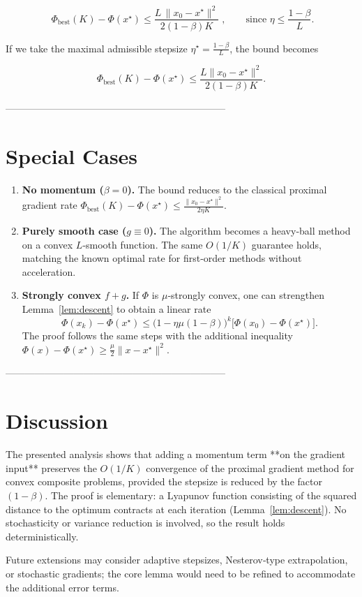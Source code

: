 \documentclass{article}
\begin{document}
\[
\boxed{\;
\Phi_{\text{best}}(K)-\Phi(x^{\star})
\le \frac{L\,\|x_{0}-x^{\star}\|^{2}}{2(1-\beta)K}
\;},
\qquad\text{since }\eta\le\frac{1-\beta}{L}.
\tag{R1}
\]

If we take the maximal admissible stepsize $\eta^{\star}= \frac{1-\beta}{L}$, the bound becomes  

\[
\Phi_{\text{best}}(K)-\Phi(x^{\star})\le \frac{L\|x_{0}-x^{\star}\|^{2}}{2(1-\beta)K}.
\]

--------------------------------------------------------------------

\section*{Special Cases}
\begin{enumerate}[label=\alph*)]
\item \textbf{No momentum ($\beta=0$).}  
The bound reduces to the classical proximal gradient rate  
$\displaystyle \Phi_{\text{best}}(K)-\Phi(x^{\star})\le \frac{\|x_{0}-x^{\star}\|^{2}}{2\eta K}$.

\item \textbf{Purely smooth case ($g\equiv0$).}  
The algorithm becomes a heavy‑ball method on a convex $L$‑smooth function.  
The same $O(1/K)$ guarantee holds, matching the known optimal rate for first‑order methods without acceleration.

\item \textbf{Strongly convex $f+g$.}  
If $\Phi$ is $\mu$‑strongly convex, one can strengthen Lemma~\ref{lem:descent} to obtain a linear rate
\[
\Phi(x_{k})-\Phi(x^{\star})\le\bigl(1-\eta\mu(1-\beta)\bigr)^{k}\bigl[\Phi(x_{0})-\Phi(x^{\star})\bigr].
\]
The proof follows the same steps with the additional inequality
$\Phi(x)-\Phi(x^{\star})\ge \frac{\mu}{2}\|x-x^{\star}\|^{2}$.
\end{enumerate}

--------------------------------------------------------------------

\section*{Discussion}
The presented analysis shows that adding a momentum term **on the gradient input** preserves the $O(1/K)$ convergence of the proximal gradient method for convex composite problems, provided the stepsize is reduced by the factor $(1-\beta)$. The proof is elementary: a Lyapunov function consisting of the squared distance to the optimum contracts at each iteration (Lemma~\ref{lem:descent}). No stochasticity or variance reduction is involved, so the result holds deterministically.

Future extensions may consider adaptive stepsizes, Nesterov‑type extrapolation, or stochastic gradients; the core lemma would need to be refined to accommodate the additional error terms.
\end{document}
